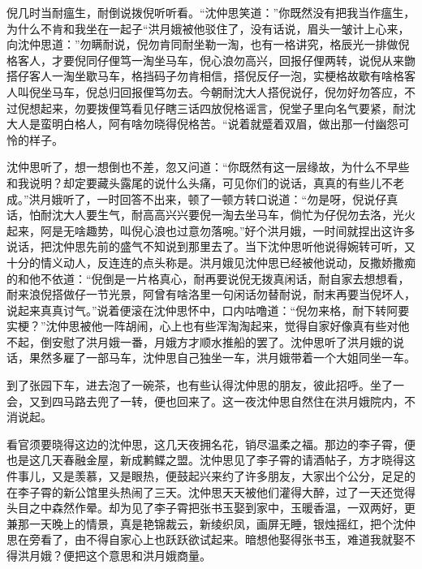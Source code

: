 \documentclass[12pt,UTF8]{ctexbook}
\begin{document}
{{{倪几时当耐瘟生，耐倒说拨倪听听看。“沈仲思笑道：”你既然没有把我当作瘟生，为什么不肯和我坐在一起子“洪月娥被他驳住了，没有话说，眉头一皱计上心来，向沈仲思道：”勿瞒耐说，倪勿肯同耐坐勒一淘，也有一格讲究，格辰光一排做倪格客人，才要倪同仔俚笃一淘坐马车，倪心浪勿高兴，回报仔俚两转，说倪从来朆搭仔客人一淘坐歇马车，格挡码子勿肯相信，搭倪反仔一泡，实梗格故歇有啥格客人叫倪坐马车，倪总归回报俚笃勿去。今朝耐沈大人搭倪说仔，倪勿好勿答应，不过倪想起来，勿要拨俚笃看见仔瞎三话四放倪格谣言，倪堂子里向名气要紧，耐沈大人是蛮明白格人，阿有啥勿晓得倪格苦。“说着就蹙着双眉，做出那一付幽怨可怜的样子。

沈仲思听了，想一想倒也不差，忽又问道：“你既然有这一层缘故，为什么不早些和我说明？却定要藏头露尾的说什么头痛，可见你们的说话，真真的有些儿不老成。”洪月娥听了，一时回答不出来，顿了一顿方转口说道：“勿是呀，倪说仔真话，怕耐沈大人要生气，耐高高兴兴要倪一淘去坐马车，倘忙为仔倪勿去洛，光火起来，阿是无啥趣势，叫倪心浪也过意勿落啘。”好个洪月娥，一时间就捏出这许多说话，把沈仲思先前的盛气不知说到那里去了。当下沈仲思听他说得婉转可听，又十分的情义动人，反连连的点头称是。洪月娥见沈仲思已经被他说动，反撒娇撒痴的和他不依道：“倪倒是一片格真心，耐再要说倪无拨真闲话，耐自家去想想看，耐来浪倪搭做仔一节光景，阿曾有啥洛里一句闲话勿替耐说，耐末再要当倪坏人，说起来真真讨气。”说着便滚在沈仲思怀中，口内咕噜道：“倪勿来格，耐下转阿要实梗？”沈仲思被他一阵胡闹，心上也有些浑淘淘起来，觉得自家好像真有些对他不起，倒安慰了洪月娥一番，月娥方才顺水推船的罢了。沈仲思听了洪月娥的说话，果然多雇了一部马车，沈仲思自己独坐一车，洪月娥带着一个大姐同坐一车。

到了张园下车，进去泡了一碗茶，也有些认得沈仲思的朋友，彼此招呼。坐了一会，又到四马路去兜了一转，便也回来了。这一夜沈仲思自然住在洪月娥院内，不消说起。

看官须要晓得这边的沈仲思，这几天夜拥名花，销尽温柔之福。那边的李子霄，便也是这几天春融金屋，新成鹣鲽之盟。沈仲思见了李子霄的请酒帖子，方才晓得这件事儿，又是羡慕，又是眼热，便鼓起兴来约了许多朋友，大家出个公分，足足的在李子霄的新公馆里头热闹了三天。沈仲思天天被他们灌得大醉，过了一天还觉得头目之中森然作晕。却为见了李子霄把张书玉娶到家中，玉暖香温，一双两好，更兼那一天晚上的情景，真是艳锦裁云，新绫织凤，画屏无睡，银烛摇红，把个沈仲思在旁看了，由不得自家心上也跃跃欲试起来。暗想他娶得张书玉，难道我就娶不得洪月娥？便把这个意思和洪月娥商量。

}}}
\end{document}
